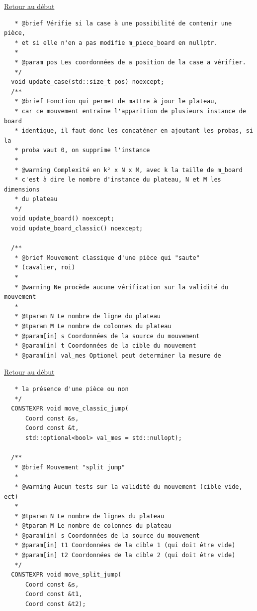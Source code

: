 {\begin{frame}[fragile]
\hyperlink{conclusion}{Retour au début}\newline
\begin{verbatim}
   * @brief Vérifie si la case à une possibilité de contenir une pièce,
   * et si elle n'en a pas modifie m_piece_board en nullptr.
   *
   * @param pos Les coordonnées de a position de la case a vérifier.
   */
  void update_case(std::size_t pos) noexcept;
  /**
   * @brief Fonction qui permet de mattre à jour le plateau,
   * car ce mouvement entraine l'apparition de plusieurs instance de board
   * identique, il faut donc les concaténer en ajoutant les probas, si la
   * proba vaut 0, on supprime l'instance
   *
   * @warning Complexité en k² x N x M, avec k la taille de m_board
   * c'est à dire le nombre d'instance du plateau, N et M les dimensions
   * du plateau
   */
  void update_board() noexcept;
  void update_board_classic() noexcept;

  /**
   * @brief Mouvement classique d'une pièce qui "saute"
   * (cavalier, roi)
   *
   * @warning Ne procède aucune vérification sur la validité du mouvement
   *
   * @tparam N Le nombre de ligne du plateau
   * @tparam M Le nombre de colonnes du plateau
   * @param[in] s Coordonnées de la source du mouvement
   * @param[in] t Coordonnées de la cible du mouvement
   * @param[in] val_mes Optionel peut determiner la mesure de
\end{verbatim}
\end{frame}

\begin{frame}[fragile]
\hyperlink{conclusion}{Retour au début}\newline
\begin{verbatim}
   * la présence d'une pièce ou non
   */
  CONSTEXPR void move_classic_jump(
      Coord const &s,
      Coord const &t,
      std::optional<bool> val_mes = std::nullopt);

  /**
   * @brief Mouvement "split jump"
   *
   * @warning Aucun tests sur la validité du mouvement (cible vide, ect)
   *
   * @tparam N Le nombre de lignes du plateau
   * @tparam M Le nombre de colonnes du plateau
   * @param[in] s Coordonnées de la source du mouvement
   * @param[in] t1 Coordonnées de la cible 1 (qui doit être vide)
   * @param[in] t2 Coordonnées de la cible 2 (qui doit être vide)
   */
  CONSTEXPR void move_split_jump(
      Coord const &s,
      Coord const &t1,
      Coord const &t2);


\end{verbatim}
\end{frame}}
